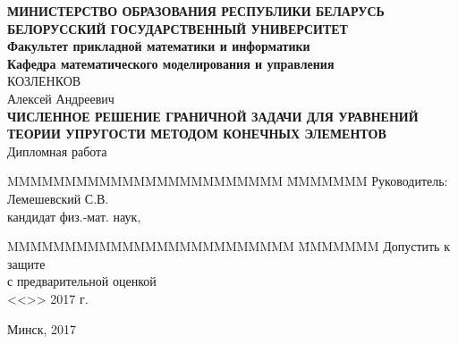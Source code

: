 \documentclass[a4paper, 14pt]{extreport}
\begin{document}
\renewcommand{\figurename}{Рисунок} %
\renewcommand{\contentsname}{\hfill\Large ОГЛАВЛЕНИЕ \hfill}
\renewcommand{\cftaftertoctitle}{\hfill}




\begin{titlepage}
    \begin{center}
        \normalsize {\bf МИНИСТЕРСТВО ОБРАЗОВАНИЯ РЕСПУБЛИКИ БЕЛАРУСЬ} \\
        \vspace{0.5cm}
        \normalsize {\bf БЕЛОРУССКИЙ ГОСУДАРСТВЕННЫЙ УНИВЕРСИТЕТ} \\
        \vspace{0.5cm}
        \normalsize {\bf Факультет прикладной математики и информатики} \\
        \vspace{0.5cm}
        \normalsize {\bf Кафедра математического моделирования и управления} \\
        \vspace{2cm}
        КОЗЛЕНКОВ \\
        Алексей Андреевич \\
        \vspace{1cm}
        \normalsize {\bf ЧИСЛЕННОЕ РЕШЕНИЕ ГРАНИЧНОЙ ЗАДАЧИ ДЛЯ УРАВНЕНИЙ ТЕОРИИ УПРУГОСТИ МЕТОДОМ
        КОНЕЧНЫХ ЭЛЕМЕНТОВ}\\
        \vspace{1cm}
        \normalsize Дипломная работа \\
        \vspace{2cm}
        \begin{tabbing}
            MMMMMMMMMMMMMMMMMMMMMMMM \= MMMMMMM \kill
            \> Руководитель: \\
            \> Лемешевский С.В. \\
            \>  кандидат физ.-мат. наук, 
        \end{tabbing}
        \begin{tabbing}
            MMMMMMMMMMMMMMMMMMMMMMMMM \= MMMMMMM \kill
            Допустить к защите \>  \\
            с предварительной оценкой \underline{\hspace{0.5cm}} \\
            <<\underline{\hspace{1cm}}>> \underline{\hspace{3.3cm}} 2017 г.
        \end{tabbing}

        \vspace{2cm}

        \large Минск, 2017
    \end{center}
    
\end{titlepage}
\end{document}
